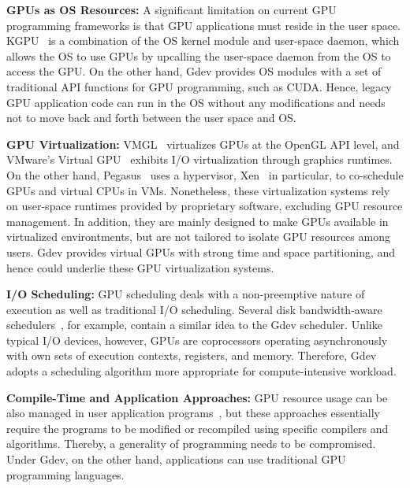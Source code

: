 \begin{comment}
Comparisons of Gdev and representatives of the above GPU resource
management approaches are summarized in Table~\ref{tab:related_work}.
\begin{table*}[t]
 \caption{Comparisons of Gdev and prior GPU resource management
 approaches.}
 \label{tab:related_work}
 \begin{center}
  {\sf
  \begin{tabular}{|l|p{12.8cm}|}
   \hline
   \hline
  \end{tabular}
  }
 \end{center}
\vspace{-1em}
\end{table*}
\end{comment}


\textbf{GPUs as OS Resources:}
A significant limitation on current GPU programming frameworks is
that GPU applications must reside in the user space.
KGPU~\cite{Sun_SECURITY11_Poster} is a combination of the OS kernel
module and user-space daemon, which allows the OS to use GPUs by
upcalling the user-space daemon from the OS to access the GPU.
On the other hand, Gdev provides OS modules with a set of traditional
API functions for GPU programming, such as CUDA.
Hence, legacy GPU application code can run in the OS without any
modifications and needs not to move back and forth between the user
space and OS.

\textbf{GPU Virtualization:}
VMGL~\cite{Lagar-Cavilla_VEE07} virtualizes GPUs at the OpenGL
API level, and VMware's Virtual GPU~\cite{Dowty_SIGOPS09} exhibits I/O
virtualization through graphics runtimes.
On the other hand, Pegasus~\cite{Gupta_ATC11} uses a hypervisor,
Xen~\cite{Barham_SOSP03} in particular, to co-schedule GPUs and virtual
CPUs in VMs.
Nonetheless, these virtualization systems rely on user-space runtimes
provided by proprietary software, excluding GPU resource management.
In addition, they are mainly designed to make GPUs available in
virtualized environtments, but are not tailored to isolate GPU resources
among users.
Gdev provides virtual GPUs with strong time and space partitioning, and
hence could underlie these GPU virtualization systems.

\textbf{I/O Scheduling:}
GPU scheduling deals with a non-preemptive nature of execution as well
as traditional I/O scheduling.
Several disk bandwidth-aware schedulers~\cite{Gulati_FAST09,
Povzner_EUROSYS08, Wang_FAST07}, for example, contain a similar idea to
the Gdev scheduler.
Unlike typical I/O devices, however, GPUs are coprocessors operating
asynchronously with own sets of execution contexts, registers, and memory.
Therefore, Gdev adopts a scheduling algorithm more appropriate for
compute-intensive workload.

\textbf{Compile-Time and Application Approaches:}
GPU resource usage can be also managed in user application
programs~\cite{Chen_IPDPS10,Guevara09,Saba_RTSS11}, but these approaches
essentially require the programs to be modified or recompiled using
specific compilers and algorithms.
Thereby, a generality of programming needs to be compromised.
Under Gdev, on the other hand, applications can use traditional GPU
programming languages.

